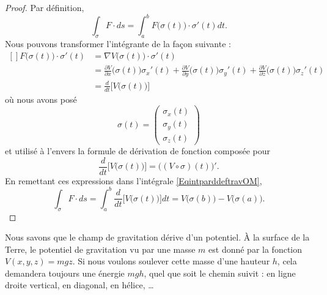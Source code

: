 \begin{proof}
    Par définition,
    \begin{equation}        \label{EqintparddeftravOM}
        \int_{\sigma} F\cdot ds=\int_a^b F\big( \sigma(t) \big)\cdot \sigma'(t)dt.
    \end{equation}
    Nous pouvons transformer l'intégrante de la façon suivante :
    \begin{equation}
        \begin{aligned}[]
            F\big( \sigma(t) \big)\cdot\sigma'(t)&=\nabla V\big( \sigma(t) \big)\cdot\sigma'(t)\\
            &=\frac{ \partial V }{ \partial x }\big( \sigma(t) \big)\sigma_x'(t) +\frac{ \partial V }{ \partial y }\big( \sigma(t) \big)\sigma_y'(t) +\frac{ \partial V }{ \partial z }\big( \sigma(t) \big)\sigma_z'(t)\\
            &=\frac{ d }{ dt }\Big[ V\big( \sigma(t) \big) \Big]
        \end{aligned}
    \end{equation}
    où nous avons posé
    \begin{equation}
        \sigma(t)=\begin{pmatrix}
            \sigma_x(t)    \\ 
            \sigma_y(t)    \\ 
            \sigma_z(t)    
        \end{pmatrix}
    \end{equation}
    et utilisé à l'envers la formule de dérivation de fonction composée pour
    \begin{equation}
             \frac{ d }{ dt }\Big[ V\big( \sigma(t) \big) \Big]=\Big( (V\circ\sigma)(t) \Big)'.
    \end{equation}
    En remettant ces expressions dans l'intégrale \eqref{EqintparddeftravOM},
    \begin{equation}
        \int_{\sigma}F\cdot ds=\int_a^b\frac{ d }{ dt }\Big[ V\big( \sigma(t) \big) \Big]dt=V\big( \sigma(b) \big)-V\big( \sigma(a) \big).
    \end{equation}
\end{proof}

\begin{example}
    Nous savons que le champ de gravitation dérive d'un potentiel. À la surface de la Terre, le potentiel de gravitation vu par une masse $m$ est donné par la fonction $V(x,y,z)=mgz$. Si nous voulons soulever cette masse d'une hauteur $h$, cela demandera toujours une énergie $mgh$, quel que soit le chemin suivit : en ligne droite vertical, en diagonal, en hélice, \ldots
\end{example}

